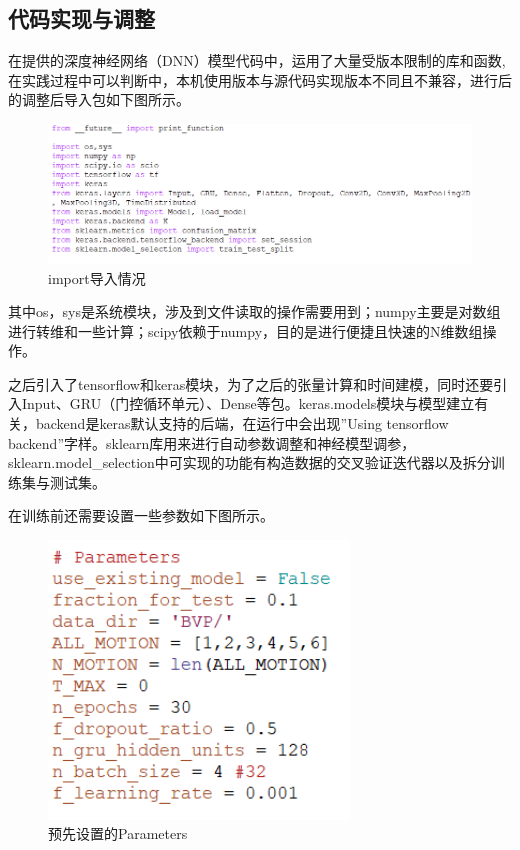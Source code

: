 \documentclass[a4paper]{article}
\begin{document}
  \subsection{代码实现与调整}
  在提供的深度神经网络（DNN）模型代码中，运用了大量受版本限制的库和函数,在实践过程中可以判断中，本机使用版本与源代码实现版本不同且不兼容，进行后的调整后导入包如下图所示。 \par
              \begin{figure}[H]
                \centering
                \includegraphics[width=16cm]{images/import.png}
                \caption{import导入情况}
                \label{fig1}
              \end{figure}
  其中os，sys是系统模块，涉及到文件读取的操作需要用到；numpy主要是对数组进行转维和一些计算；scipy依赖于numpy，目的是进行便捷且快速的N维数组操作。 \par
  之后引入了tensorflow和keras模块，为了之后的张量计算和时间建模，同时还要引入Input、GRU（门控循环单元）、Dense等包。keras.models模块与模型建立有关，backend是keras默认支持的后端，在运行中会出现”Using tensorflow backend”字样。sklearn库用来进行自动参数调整和神经模型调参，sklearn.model\_selection中可实现的功能有构造数据的交叉验证迭代器以及拆分训练集与测试集。\par
  在训练前还需要设置一些参数如下图所示。\par
                \begin{figure}[H]
                \centering
                \includegraphics[width=8cm]{images/parameters.png}
                \caption{预先设置的Parameters}
                \label{fig1}
              \end{figure}
\end{document}
